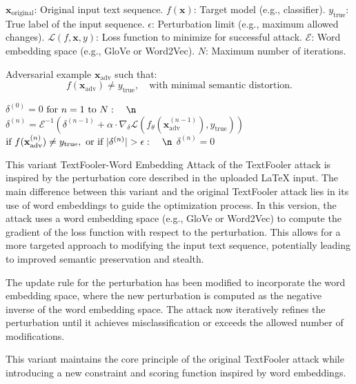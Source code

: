 $\mathbf{x}_{\text{original}}$: Original input text sequence.
$f(\mathbf{x})$: Target model (e.g., classifier).
$y_{\text{true}}$: True label of the input sequence.
$\epsilon$: Perturbation limit (e.g., maximum allowed changes).
$\mathcal{L}(f, \mathbf{x}, y)$: Loss function to minimize for successful attack.
$\mathcal{E}$: Word embedding space (e.g., GloVe or Word2Vec).
$N$: Maximum number of iterations.

Adversarial example $\mathbf{x}_{\text{adv}}$ such that:
  \[
  f(\mathbf{x}_{\text{adv}}) \neq y_{\text{true}}, \quad \text{with minimal semantic distortion}.
  \]

$\delta^{(0)} = 0$
$\text{for } n = 1 \text{ to } N: \quad\n$
$\delta^{(n)} = \mathcal{E}^{-1} \left( \delta^{(n-1)} + \alpha \cdot \nabla_\delta \mathcal{L}(f_\theta(\mathbf{x}_{\text{adv}}^{(n-1)}), y_{\text{true}}) \right)$
$\text{if } f(\mathbf{x}_{\text{adv}}^{(n)}) \neq y_{\text{true}}, \text{ or if } |\delta^{(n)}| > \epsilon: \quad\n$
$\delta^{(n)} = 0$

This variant TextFooler-Word Embedding Attack of the TextFooler attack is inspired by the perturbation core described in the uploaded LaTeX input. The main difference between this variant and the original TextFooler attack lies in its use of word embeddings to guide the optimization process. In this version, the attack uses a word embedding space (e.g., GloVe or Word2Vec) to compute the gradient of the loss function with respect to the perturbation. This allows for a more targeted approach to modifying the input text sequence, potentially leading to improved semantic preservation and stealth.

The update rule for the perturbation has been modified to incorporate the word embedding space, where the new perturbation is computed as the negative inverse of the word embedding space. The attack now iteratively refines the perturbation until it achieves misclassification or exceeds the allowed number of modifications.

This variant maintains the core principle of the original TextFooler attack while introducing a new constraint and scoring function inspired by word embeddings.
